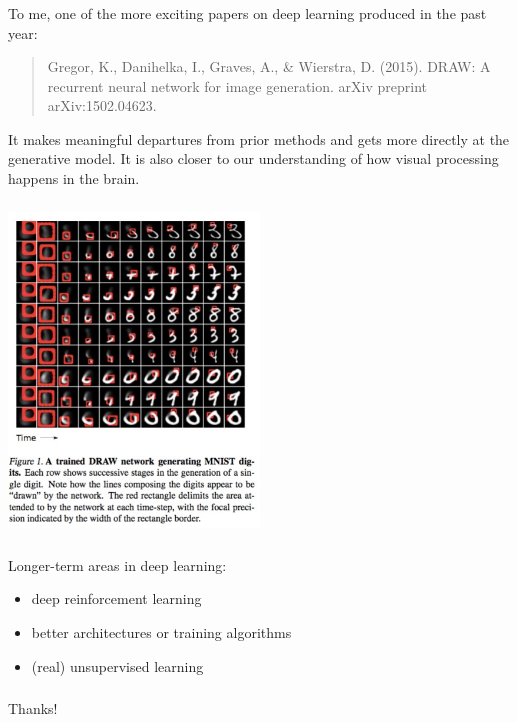 \documentclass[xetex,mathserif,serif,aspectratio=169]{beamer}
\begin{document}
\begin{frame}[fragile] \frametitle{} \oldB \small

To me, one of the more exciting papers on deep learning
produced in the past year:
\begin{quote}
Gregor, K., Danihelka, I., Graves, A., \& Wierstra, D. (2015). DRAW: A recurrent neural network for image generation. arXiv preprint arXiv:1502.04623.
\end{quote}
It makes meaningful departures from prior methods and gets
more directly at the generative model. It is also closer to
our understanding of how visual processing happens in the
brain.

\end{frame}

\begin{frame}[fragile] \frametitle{} \oldB \small

\begin{center}
\includegraphics[width=0.5\textwidth]{img/draw.jpg}
\end{center}

\end{frame}

\begin{frame}[fragile] \frametitle{} \oldB \large

Longer-term areas in deep learning:
\begin{itemize}
\item deep reinforcement learning
\item better architectures or training algorithms
\item (real) unsupervised learning
\end{itemize}

\end{frame}

\begin{frame}[fragile] \frametitle{} \oldB \small

\begin{center}
{\color{yaleblue}\sc\fontsize{2cm}{0cm}\selectfont Thanks!}
\end{center}

\end{frame}
\end{document}
